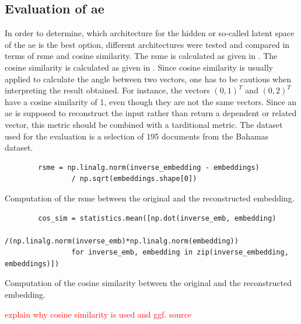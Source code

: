 \subsection*{Evaluation of \ac{ae}}\label{subsec:evaluation-ae}

In order to determine, which architecture for the hidden or so-called latent space of the \ac{ae} is the best option, 
different architectures were tested and compared in terms of \ac{rsme} and cosine similarity.
The \ac{rsme} is calculated as given in .
The cosine similarity is calculated as given in .
Since cosine similarity is usually applied to calculate the angle between two vectors, one has to be cautious when interpreting the result obtained.
For instance, the vectors $\left( 0, 1 \right)^T$ and $\left( 0, 2 \right)^T$ have a cosine similarity of 1, even though they are not the same vectors.
Since an \ac{ae} is supposed to reconstruct the input rather than return a dependent or related vector, this metric should be combined with a tarditional metric.
The dataset used for the evaluation is a selection of 195 documents from the Bahamas dataset.

\begin{listing}[htp]
    \begin{verbatim}
        rsme = np.linalg.norm(inverse_embedding - embeddings) 
                / np.sqrt(embeddings.shape[0])
    \end{verbatim}
    \caption[Computation of the \ac{rsme}]{
        Computation of the \ac{rsme} between the original and the reconstructed embedding.
    }
    \label{lst:impl-rsme}
\end{listing}

\begin{listing}[htp]
    \begin{verbatim}
        cos_sim = statistics.mean([np.dot(inverse_emb, embedding)
                /(np.linalg.norm(inverse_emb)*np.linalg.norm(embedding)) 
                for inverse_emb, embedding in zip(inverse_embedding, embeddings)])
    \end{verbatim}
    \caption[Computation of the cosine similarity]{
        Computation of the cosine similarity between the original and the reconstructed embedding.
    }
    \label{lst:impl-cos_sim}
\end{listing}

\textcolor{red}{explain why cosine similarity is used and ggf. source}

